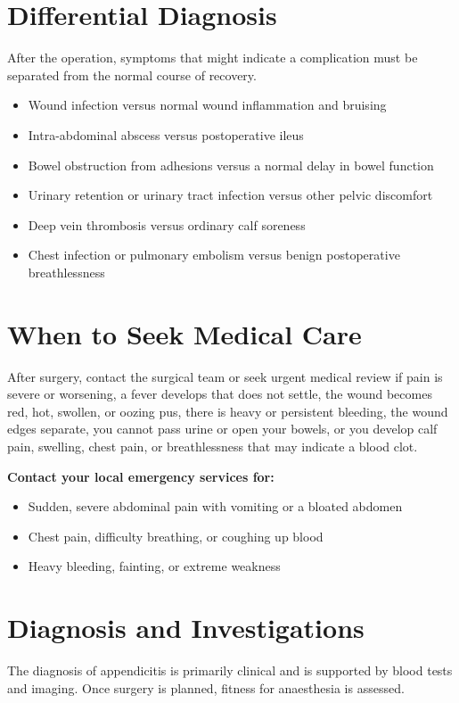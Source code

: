 \section*{Differential Diagnosis}
After the operation, symptoms that might indicate a complication must be separated from the normal course of recovery.

\begin{itemize}
    \item Wound infection versus normal wound inflammation and bruising
    \item Intra-abdominal abscess versus postoperative ileus
    \item Bowel obstruction from adhesions versus a normal delay in bowel function
    \item Urinary retention or urinary tract infection versus other pelvic discomfort
    \item Deep vein thrombosis versus ordinary calf soreness
    \item Chest infection or pulmonary embolism versus benign postoperative breathlessness
\end{itemize}

\section*{When to Seek Medical Care}
After surgery, contact the surgical team or seek urgent medical review if pain is severe or worsening, a fever develops that does not settle, the wound becomes red, hot, swollen, or oozing pus, there is heavy or persistent bleeding, the wound edges separate, you cannot pass urine or open your bowels, or you develop calf pain, swelling, chest pain, or breathlessness that may indicate a blood clot.

\textbf{Contact your local emergency services for:}
\begin{itemize}
    \item Sudden, severe abdominal pain with vomiting or a bloated abdomen
    \item Chest pain, difficulty breathing, or coughing up blood
    \item Heavy bleeding, fainting, or extreme weakness
\end{itemize}

\section*{Diagnosis and Investigations}
The diagnosis of appendicitis is primarily clinical and is supported by blood tests and imaging. Once surgery is planned, fitness for anaesthesia is assessed.

